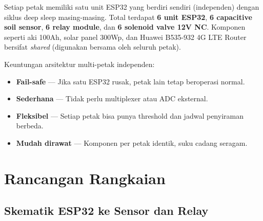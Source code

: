 \documentclass[12pt,a4paper,oneside]{report}
\begin{document}
Setiap petak memiliki satu unit ESP32 yang berdiri sendiri (independen) dengan siklus deep sleep masing-masing. Total terdapat \textbf{6 unit ESP32}, \textbf{6 capacitive soil sensor}, \textbf{6 relay module}, dan \textbf{6 solenoid valve 12V NC}. Komponen seperti aki 100Ah, solar panel 300Wp, dan Huawei B535-932 4G LTE Router bersifat \textit{shared} (digunakan bersama oleh seluruh petak).

Keuntungan arsitektur multi-petak independen:
\begin{itemize}
    \item \textbf{Fail-safe} — Jika satu ESP32 rusak, petak lain tetap beroperasi normal.
    \item \textbf{Sederhana} — Tidak perlu multiplexer atau ADC eksternal.
    \item \textbf{Fleksibel} — Setiap petak bisa punya threshold dan jadwal penyiraman berbeda.
    \item \textbf{Mudah dirawat} — Komponen per petak identik, suku cadang seragam.
\end{itemize}

\section{Rancangan Rangkaian}

\subsection{Skematik ESP32 ke Sensor dan Relay}
\end{document}
